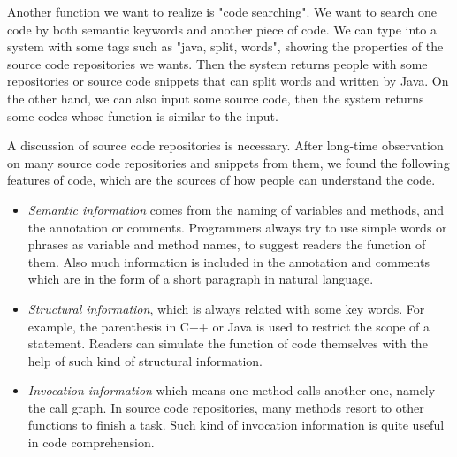 Another function we want to realize is "code searching". We want to search one code by both semantic keywords and another piece of code. We can type into a system with some tags such as "java, split, words", showing the
properties of the source code repositories we wants. Then the system returns people with some repositories or
source code snippets that can split words and written by Java. On the other hand, we can also input some source code, then the system returns some codes whose function is similar to the input.

A discussion of source code repositories is necessary.
After long-time observation on many source code repositories and snippets from them,
we found the following features of code, which are the sources of how people can understand the code.
\begin{itemize}
\item {\em Semantic information} comes from the naming of variables and methods, and the annotation or comments.
Programmers always try to use simple words or phrases as variable and method names, to suggest readers the
function of them. Also much information is included in the annotation and comments which are in the form
of a short paragraph in natural language.
\item {\em Structural information}, which is always related with some key words. For example, the parenthesis in C++ or Java
is used to restrict the scope of a statement. Readers can simulate the function of code themselves with the help of
such kind of structural information.
\item {\em Invocation information} which means one method calls another one, namely the call graph. In source
code repositories, many methods resort to other functions to finish a task. Such kind of invocation information
is quite useful in code comprehension.
\end{itemize}

